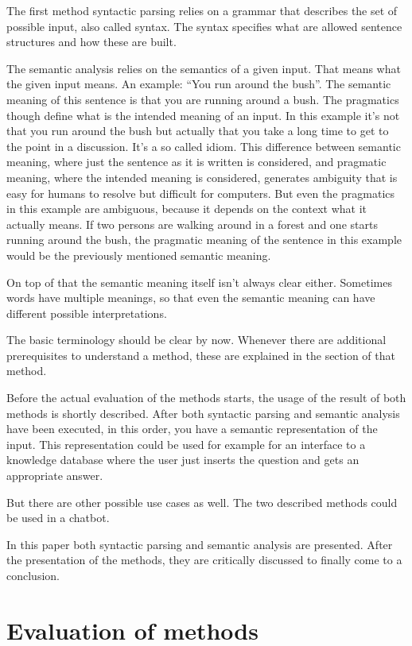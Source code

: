 \documentclass[12pt,twoside]{scrartcl}
\theoremstyle{plain}
\theoremstyle{definition}
\theoremstyle{remark}
\begin{document}
	The first method syntactic parsing relies on a grammar that describes the set of possible input, also called syntax. The syntax specifies what are allowed sentence structures and how these are built.
	
	The semantic analysis relies on the semantics of a given input. That means what the given input means. An example: ``You run around the bush''. The semantic meaning of this sentence is that you are running around a bush. 
	The pragmatics though define what is the intended meaning of an input. In this example it's not that you run around the bush but actually that you take a long time to get to the point in a discussion. It's a so called idiom. This difference between semantic meaning, where just the sentence as it is written is considered, and pragmatic meaning, where the intended meaning is considered, generates ambiguity that is easy for humans to resolve but difficult for computers. But even the pragmatics in this example are ambiguous, because it depends on the context what it actually means. If two persons are walking around in a forest and one starts running around the bush, the pragmatic meaning of the sentence in this example would be the previously mentioned semantic meaning.
	
	On top of that the semantic meaning itself isn't always clear either. Sometimes words have multiple meanings, so that even the semantic meaning can have different possible interpretations.
	
	The basic terminology should be clear by now. Whenever there are additional prerequisites to understand a method, these are explained in the section of that method.
	
	Before the actual evaluation of the methods starts, the usage of the result of both methods is shortly described. After both syntactic parsing and semantic analysis have been executed, in this order, you have a semantic representation of the input. This representation could be used for example for an interface to a knowledge database where the user just inserts the question and gets an appropriate answer.
	
	But there are other possible use cases as well. The two described methods could be used in a chatbot.
	
	In this paper both syntactic parsing and semantic analysis are presented. After the presentation of the methods, they are critically discussed to finally come to a conclusion.

\section{Evaluation of methods}
\label{sec:evalMethods}
	
\end{document}
